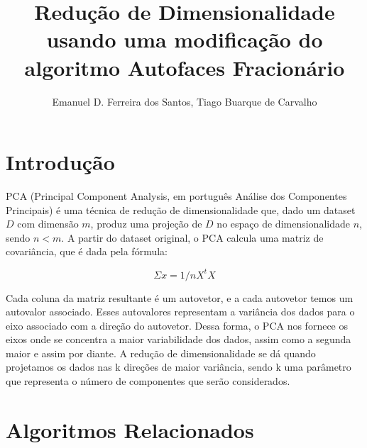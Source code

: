 \documentclass[12pt]{article}
\begin{document}
\title{Redução de Dimensionalidade usando uma modificação do algoritmo Autofaces Fracionário}
\author{Emanuel D. Ferreira dos Santos, Tiago Buarque de Carvalho}
\maketitle


\section{Introdução}

PCA (Principal Component Analysis, em português Análise dos Componentes Principais) é  uma técnica de redução de dimensionalidade que, dado um dataset $D$ com dimensão $m$, produz uma projeção de $D$ no espaço de dimensionalidade $n$, sendo $n < m$.
A partir do dataset original, o PCA calcula uma matriz de covariância, que é dada pela fórmula:

        $$\Sigma x = 1/n X^t X$$

    Cada coluna da matriz resultante é um autovetor, e a cada autovetor temos um autovalor associado. Esses autovalores representam a variância dos dados para o eixo associado com a direção do autovetor. Dessa forma, o PCA nos fornece os eixos onde se concentra a maior variabilidade dos dados, assim como a segunda maior e assim por diante.
    A redução de dimensionalidade se dá quando projetamos os dados nas k direções de maior variância, sendo k uma parâmetro que representa o número de componentes que serão considerados.



\section{Algoritmos Relacionados}
\end{document}
